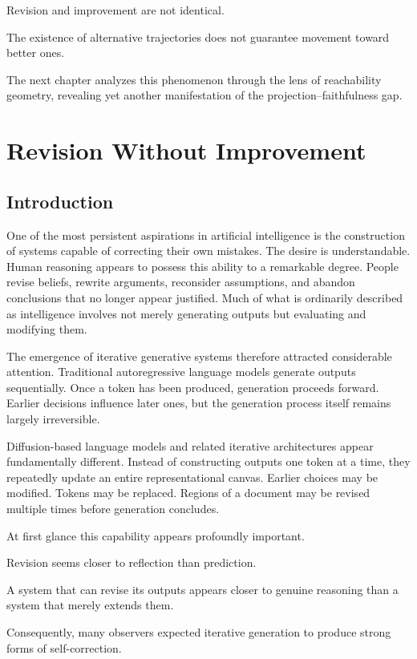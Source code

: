 \documentclass[11pt,oneside,openany]{book}
\begin{document}
Revision and improvement are not identical.

The existence of alternative trajectories does not guarantee movement toward better ones.

The next chapter analyzes this phenomenon through the lens of reachability geometry, revealing yet another manifestation of the projection–faithfulness gap.

\chapter{Revision Without Improvement}

\section{Introduction}

One of the most persistent aspirations in artificial intelligence is the construction of systems capable of correcting their own mistakes. The desire is understandable. Human reasoning appears to possess this ability to a remarkable degree. People revise beliefs, rewrite arguments, reconsider assumptions, and abandon conclusions that no longer appear justified. Much of what is ordinarily described as intelligence involves not merely generating outputs but evaluating and modifying them.

The emergence of iterative generative systems therefore attracted considerable attention. Traditional autoregressive language models generate outputs sequentially. Once a token has been produced, generation proceeds forward. Earlier decisions influence later ones, but the generation process itself remains largely irreversible.

Diffusion-based language models and related iterative architectures appear fundamentally different. Instead of constructing outputs one token at a time, they repeatedly update an entire representational canvas. Earlier choices may be modified. Tokens may be replaced. Regions of a document may be revised multiple times before generation concludes.

At first glance this capability appears profoundly important.

Revision seems closer to reflection than prediction.

A system that can revise its outputs appears closer to genuine reasoning than a system that merely extends them.

Consequently, many observers expected iterative generation to produce strong forms of self-correction.
\end{document}
